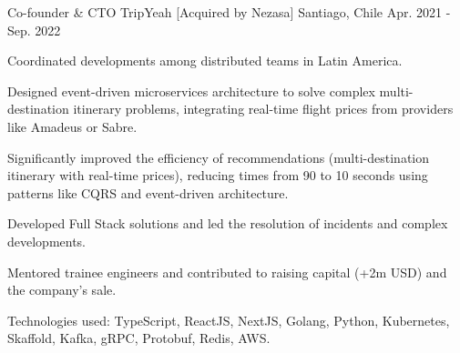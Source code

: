 \begin{cventries}
  \cventry
    {Co-founder \& CTO} %
    {TripYeah [Acquired by Nezasa]} %
    {Santiago, Chile} %
    {Apr. 2021 - Sep. 2022} %
    {
      \begin{cvitems} %
        \item {Coordinated developments among distributed teams in Latin America.}
        \item {Designed event-driven microservices architecture to solve complex multi-destination itinerary problems, integrating real-time flight prices from providers like Amadeus or Sabre.}
        \item {Significantly improved the efficiency of recommendations (multi-destination itinerary with real-time prices), reducing times from 90 to 10 seconds using patterns like CQRS and event-driven architecture.}
        \item {Developed Full Stack solutions and led the resolution of incidents and complex developments.}
        \item {Mentored trainee engineers and contributed to raising capital (+2m USD) and the company's sale.}
        \item {Technologies used: TypeScript, ReactJS, NextJS, Golang, Python, Kubernetes, Skaffold, Kafka, gRPC, Protobuf, Redis, AWS.}
      \end{cvitems}
    }
\end{cventries} 
\newpage 

